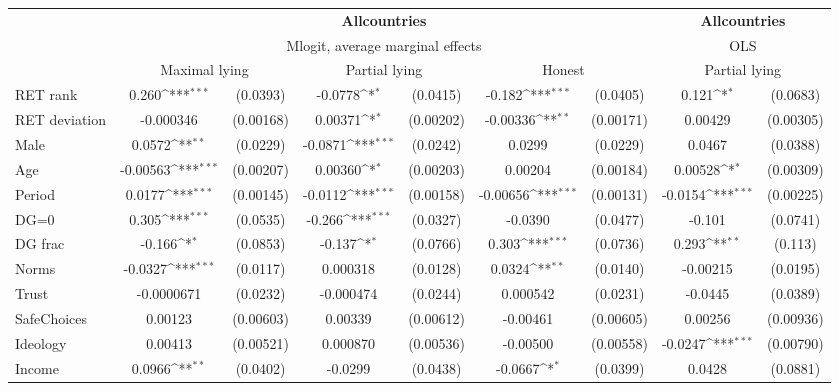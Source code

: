 \def\sym#1{\ifmmode^{#1}\else\(^{#1}\)\fi}
\begin{tabular}{l|cccccc|cc}
\hline\hline
&\multicolumn{6}{c|}{\bf All\space{}countries}&\multicolumn{2}{c}{\bf All\space{}countries}\\ &\multicolumn{6}{c|}{Mlogit, average marginal effects }&\multicolumn{2}{c}{OLS}\\
                &\multicolumn{2}{c}{Maximal lying}&\multicolumn{2}{c}{Partial lying}&\multicolumn{2}{c|}{Honest}  &\multicolumn{2}{c}{Partial lying}\\
\hline
RET rank        &    0.260\sym{***}& (0.0393)&  -0.0778\sym{*}  & (0.0415)&   -0.182\sym{***}& (0.0405)&    0.121\sym{*}  & (0.0683)\\
RET deviation   &-0.000346         &(0.00168)&  0.00371\sym{*}  &(0.00202)& -0.00336\sym{**} &(0.00171)&  0.00429         &(0.00305)\\
Male            &   0.0572\sym{**} & (0.0229)&  -0.0871\sym{***}& (0.0242)&   0.0299         & (0.0229)&   0.0467         & (0.0388)\\
Age             & -0.00563\sym{***}&(0.00207)&  0.00360\sym{*}  &(0.00203)&  0.00204         &(0.00184)&  0.00528\sym{*}  &(0.00309)\\
Period          &   0.0177\sym{***}&(0.00145)&  -0.0112\sym{***}&(0.00158)& -0.00656\sym{***}&(0.00131)&  -0.0154\sym{***}&(0.00225)\\
DG=0          &    0.305\sym{***}& (0.0535)&   -0.266\sym{***}& (0.0327)&  -0.0390         & (0.0477)&   -0.101         & (0.0741)\\
DG frac         &   -0.166\sym{*}  & (0.0853)&   -0.137\sym{*}  & (0.0766)&    0.303\sym{***}& (0.0736)&    0.293\sym{**} &  (0.113)\\
Norms           &  -0.0327\sym{***}& (0.0117)& 0.000318         & (0.0128)&   0.0324\sym{**} & (0.0140)& -0.00215         & (0.0195)\\
Trust         &-0.0000671         & (0.0232)&-0.000474         & (0.0244)& 0.000542         & (0.0231)&  -0.0445         & (0.0389)\\
SafeChoices     &  0.00123         &(0.00603)&  0.00339         &(0.00612)& -0.00461         &(0.00605)&  0.00256         &(0.00936)\\
Ideology        &  0.00413         &(0.00521)& 0.000870         &(0.00536)& -0.00500         &(0.00558)&  -0.0247\sym{***}&(0.00790)\\
Income          &   0.0966\sym{**} & (0.0402)&  -0.0299         & (0.0438)&  -0.0667\sym{*}  & (0.0399)&   0.0428         & (0.0881)\\

\end{tabular}
